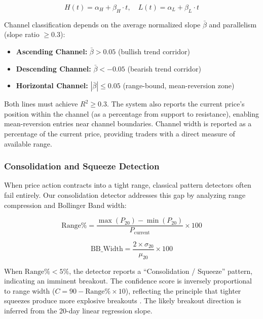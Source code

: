 \documentclass[12pt,a4paper]{article}
\begin{document}
\begin{equation}
H(t) = \alpha_H + \beta_H \cdot t, \quad L(t) = \alpha_L + \beta_L \cdot t
\end{equation}

Channel classification depends on the average normalized slope $\bar{\beta}$ and parallelism (slope ratio $\geq 0.3$):

\begin{itemize}
    \item \textbf{Ascending Channel:} $\bar{\beta} > 0.05$ (bullish trend corridor)
    \item \textbf{Descending Channel:} $\bar{\beta} < -0.05$ (bearish trend corridor)
    \item \textbf{Horizontal Channel:} $|\bar{\beta}| \leq 0.05$ (range-bound, mean-reversion zone)
\end{itemize}

Both lines must achieve $R^2 \geq 0.3$. The system also reports the current price's position within the channel (as a percentage from support to resistance), enabling mean-reversion entries near channel boundaries. Channel width is reported as a percentage of the current price, providing traders with a direct measure of available range.

\subsubsection{Consolidation and Squeeze Detection}

When price action contracts into a tight range, classical pattern detectors often fail entirely. Our consolidation detector addresses this gap by analyzing range compression and Bollinger Band width:

\begin{equation}
\text{Range\%} = \frac{\max(P_{20}) - \min(P_{20})}{P_{\text{current}}} \times 100
\end{equation}

\begin{equation}
\text{BB\_Width} = \frac{2 \times \sigma_{20}}{\mu_{20}} \times 100
\end{equation}

When $\text{Range\%} < 5\%$, the detector reports a ``Consolidation / Squeeze'' pattern, indicating an imminent breakout. The confidence score is inversely proportional to range width ($C = 90 - \text{Range\%} \times 10$), reflecting the principle that tighter squeezes produce more explosive breakouts \cite{bollinger2002bollinger}. The likely breakout direction is inferred from the 20-day linear regression slope.
\end{document}
